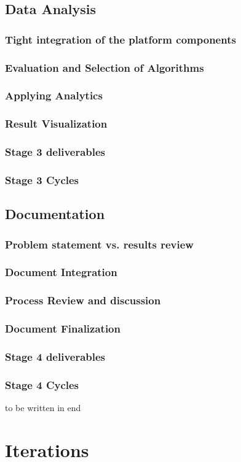 \subsection{Data Analysis}
\subsubsection{Tight integration of the platform components}
\subsubsection{Evaluation and Selection of Algorithms}
\subsubsection{Applying Analytics}
\subsubsection{Result Visualization}
\subsubsection{Stage 3 deliverables}
\subsubsection{Stage 3 Cycles}
\subsection{Documentation}
\subsubsection{Problem statement vs. results review}
\subsubsection{Document Integration}
\subsubsection{Process Review and discussion}
\subsubsection{Document Finalization}
\subsubsection{Stage 4 deliverables}
\subsubsection{Stage 4 Cycles}
to be written in end
\section{Iterations}




  

  

 
